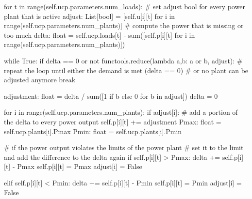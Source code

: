 \begin{python}[
  float,
  caption={Adjusting the UCP Solution},
  label={implementation:quantum.read.solution.algorithm}
]
for t in range(self.ucp.parameters.num_loads):
  # set adjust bool for every power plant that is active
  adjust: List[bool] = [self.u[i][t] for i in range(self.ucp.parameters.num_plants)]
  # compute the power that is missing or too much
  delta: float = self.ucp.loads[t] - sum([self.p[i][t] for i in range(self.ucp.parameters.num_plants)])

  while True:
    if delta == 0 or not functools.reduce(lambda a,b: a or b, adjust):
      # repeat the loop until either the demand is met (delta == 0)
      # or no plant can be adjusted anymore
      break

    adjustment: float = delta / sum([1 if b else 0 for b in adjust])
    delta = 0

    for i in range(self.ucp.parameters.num_plants):
      if adjust[i]:
        # add a portion of the delta to every power output
        self.p[i][t] += adjustment
        Pmax: float = self.ucp.plants[i].Pmax
        Pmin: float = self.ucp.plants[i].Pmin

        # if the power output violates the limits of the power plant
        # set it to the limit and add the difference to the delta again
        if self.p[i][t] > Pmax:
          delta += self.p[i][t] - Pmax
          self.p[i][t] = Pmax
          adjust[i] = False

        elif self.p[i][t] < Pmin:
          delta += self.p[i][t] - Pmin
          self.p[i][t] = Pmin
          adjust[i] = False
\end{python}
